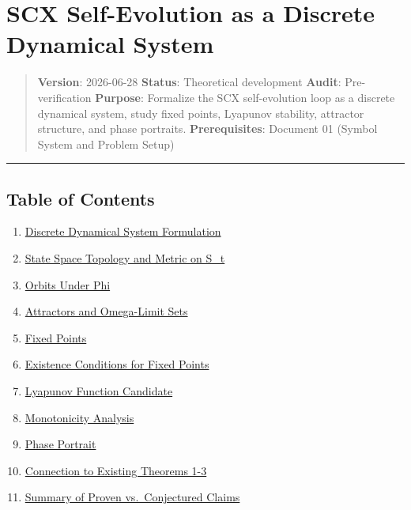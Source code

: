 \documentclass[
  12pt,
]{article}
\author{SCX}
\date{2026}
\providecommand{\tightlist}{%
  \setlength{\itemsep}{0pt}\setlength{\parskip}{0pt}}
\begin{document}
\section{SCX Self-Evolution as a Discrete Dynamical
System}\label{scx-self-evolution-as-a-discrete-dynamical-system}

\begin{quote}
\textbf{Version}: 2026-06-28 \textbar{} \textbf{Status}: Theoretical
development \textbar{} \textbf{Audit}: Pre-verification
\textbf{Purpose}: Formalize the SCX self-evolution loop as a discrete
dynamical system, study fixed points, Lyapunov stability, attractor
structure, and phase portraits. \textbf{Prerequisites}: Document 01
(Symbol System and Problem Setup)
\end{quote}

\begin{center}\rule{0.5\linewidth}{0.5pt}\end{center}

\subsection{Table of Contents}\label{table-of-contents}

\begin{enumerate}
\def\labelenumi{\arabic{enumi}.}
\tightlist
\item
  \hyperref[1-discrete-dynamical-system-formulation]{Discrete Dynamical
  System Formulation}
\item
  \hyperref[2-state-space-topology-and-metric-on-s_t]{State Space
  Topology and Metric on S\_t}
\item
  \hyperref[3-orbits-under-phi]{Orbits Under Phi}
\item
  \hyperref[4-attractors-and-omega-limit-sets]{Attractors and
  Omega-Limit Sets}
\item
  \hyperref[5-fixed-points]{Fixed Points}
\item
  \hyperref[6-existence-conditions-for-fixed-points]{Existence
  Conditions for Fixed Points}
\item
  \hyperref[7-lyapunov-function-candidate]{Lyapunov Function Candidate}
\item
  \hyperref[8-monotonicity-analysis]{Monotonicity Analysis}
\item
  \hyperref[9-phase-portrait]{Phase Portrait}
\item
  \hyperref[10-connection-to-existing-theorems-1-3]{Connection to
  Existing Theorems 1-3}
\item
  \hyperref[11-summary-of-proven-vs-conjectured-claims]{Summary of
  Proven vs.~Conjectured Claims}
\end{enumerate}
\end{document}
